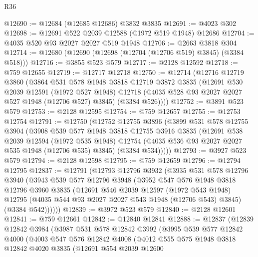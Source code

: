 \begin{lexlean}{R36}
\begin{coremodule}
@12690 := @12684 (@12685 @12686) @3832 @3835
@12691 := @4023 @302
@12698 := @12691 @522 @2039 @12588 (@1972 @519 @1948) @12686
@12704 := @4035 @520 @93 @2027 @2027 @519 @1948
@12706 := @2663 @3818 @304
@12714 := @12680 (@12690 (@12698 (@12704 (@12706 @519) @3845) (@3384 @518)))
@12716 := @3855 @523 @579
@12717 := @2128 @12592
@12718 := @759 @12655
@12719 := @12717 @12718
@12750 := @12714
    (@12716
      @12719
      @3860
      (@3864
        @531
        @578
        @1948
        @3818
        @12719
        @3872
        @3835
        (@12691
          @530
          @2039
          @12591
          (@1972 @527 @1948)
          @12718
          (@4035 @528 @93 @2027 @2027 @527 @1948 (@12706 @527) @3845)
          (@3384 @526))))
@12752 := @3891 @523 @579
@12753 := @2128 @12595
@12754 := @759 @12657
@12755 := @12753 @12754
@12791 := @12750
    (@12752
      @12755
      @3896
      (@3899
        @531
        @578
        @12755
        @3904
        (@3908
          @539
          @577
          @1948
          @3818
          @12755
          @3916
          @3835
          (@12691
            @538
            @2039
            @12594
            (@1972 @535 @1948)
            @12754
            (@4035 @536 @93 @2027 @2027 @535 @1948 (@12706 @535) @3845)
            (@3384 @534)))))
@12793 := @3927 @523 @579
@12794 := @2128 @12598
@12795 := @759 @12659
@12796 := @12794 @12795
@12837 := @12791
    (@12793
      @12796
      @3932
      (@3935
        @531
        @578
        @12796
        @3940
        (@3943
          @539
          @577
          @12796
          @3948
          (@3952
            @547
            @576
            @1948
            @3818
            @12796
            @3960
            @3835
            (@12691
              @546
              @2039
              @12597
              (@1972 @543 @1948)
              @12795
              (@4035 @544 @93 @2027 @2027 @543 @1948 (@12706 @543) @3845)
              (@3384 @542))))))
@12839 := @3972 @523 @579
@12840 := @2128 @12601
@12841 := @759 @12661
@12842 := @12840 @12841
@12888 := @12837
    (@12839
      @12842
      @3984
      (@3987
        @531
        @578
        @12842
        @3992
        (@3995
          @539
          @577
          @12842
          @4000
          (@4003
            @547
            @576
            @12842
            @4008
            (@4012
              @555
              @575
              @1948
              @3818
              @12842
              @4020
              @3835
              (@12691
                @554
                @2039
                @12600

\end{coremodule}
\end{lexlean}

